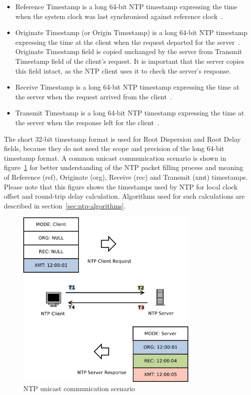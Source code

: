 \begin{itemize}
Kiss codes are particularly used by the server to tell the client to stop sending packets or
to increase its polling interval.
For stratum 1, this is a four-octet, left-justified, zero-padded ASCII
string assigned to the reference clock (e.g. "GPS" when synchronising against Global Position System clock).
Above stratum 1, this is the reference identifier of the server used for synchronisation
and can be used by the client together with stratum field to detect loops in the NTP hierarchy.
If communicating over IPv4, the identifier is IPv4 address.
If communicating over IPv6, it is the first four octets of the MD5 hash of the IPv6 address~\cite{rfc5905}.
\item
Reference Timestamp is a long 64-bit NTP timestamp expressing the time
when the system clock was last synchronised against reference clock~\cite{rfc5905}.
\item
Originate Timestamp (or Origin Timestamp) is a long 64-bit NTP timestamp expressing the time
at the client when the request departed for the server~\cite{rfc5905}.
Originate Timestamp field is copied
unchanged by the server from Transmit Timestamp field of the client's request.
It is important that the server copies this field intact,
as the NTP client uses it to check the server's response.
\item
Receive Timestamp is a long 64-bit NTP timestamp expressing the time
at the server when the request arrived from the client~\cite{rfc5905}.
\item
Transmit Timestamp is a long 64-bit NTP timestamp expressing the time
at the server when the response left for the client~\cite{rfc5905}.
\end{itemize}

The short 32-bit timestamp format is used for Root Dispersion and Root Delay fields,
because they do not need the scope and precision of the long 64-bit timestamp format.
A common unicast communication scenario is shown in figure~\ref{fig:ntp-client-server}
for better understanding of the NTP packet filling process and meaning of
Reference (ref), Originate (org), Receive (rec) and Transmit (xmt) timestamps.
Please note that this figure shows the
timestamps used by NTP for local clock offset and round-trip delay calculation.
Algorithms used for such calculations are described in section~\ref{sec:ntp-algorithms}.

\begin{figure}
	\centering
	\includegraphics[width=9cm,keepaspectratio]{fig/ntp-client-server.pdf}
	\caption{NTP unicast communication scenario}
	\label{fig:ntp-client-server}
\end{figure}

